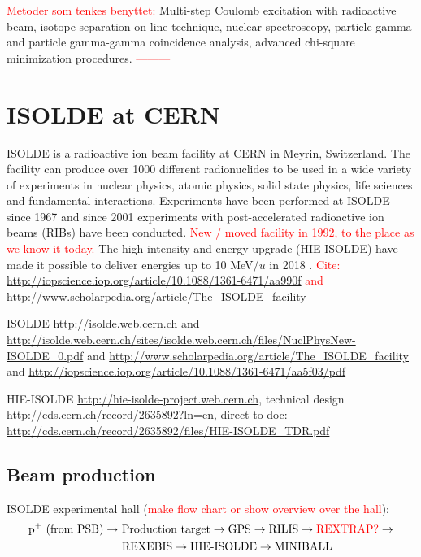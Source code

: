 \documentclass[twoside,english]{uiofysmaster/uiofysmaster}
\begin{document}
\textcolor{red}{Metoder som tenkes benyttet:} \newline
Multi-step Coulomb excitation with radioactive beam, isotope separation on-line technique, nuclear spectroscopy, particle-gamma and particle gamma-gamma coincidence analysis, advanced chi-square minimization procedures. \newline
\textcolor{red}{---------} \newline


\section{ISOLDE at CERN}
ISOLDE is a radioactive ion beam facility at CERN in Meyrin, Switzerland. The facility can produce over 1000 different radionuclides to be used in a wide variety of experiments in nuclear physics, atomic physics, solid state physics, life sciences and fundamental interactions. Experiments have been performed at ISOLDE since 1967 and since 2001 experiments with post-accelerated radioactive ion beams (RIBs) have been conducted. \textcolor{red}{New / moved facility in 1992, to the place as we know it today.} The high intensity and energy upgrade (HIE-ISOLDE) have made it possible to deliver energies up to 10 MeV/$u$ in 2018 \cite{Borge2018}. 
 \textcolor{red}{Cite: \url{http://iopscience.iop.org/article/10.1088/1361-6471/aa990f} and \url{http://www.scholarpedia.org/article/The_ISOLDE_facility}}  


\bigskip

ISOLDE \url{http://isolde.web.cern.ch} and \url{http://isolde.web.cern.ch/sites/isolde.web.cern.ch/files/NuclPhysNew-ISOLDE_0.pdf} and \url{http://www.scholarpedia.org/article/The_ISOLDE_facility}  and \url{http://iopscience.iop.org/article/10.1088/1361-6471/aa5f03/pdf}


HIE-ISOLDE \url{http://hie-isolde-project.web.cern.ch}, technical design \url{http://cds.cern.ch/record/2635892?ln=en}, direct to doc: \url{http://cds.cern.ch/record/2635892/files/HIE-ISOLDE_TDR.pdf}


\subsection{Beam production}

ISOLDE experimental hall (\textcolor{red}{make flow chart or show overview over the hall}):
\begin{align*}
	\text{p}^+ ~(\text{from PSB}) \rightarrow~ &\text{Production target} \rightarrow \text{GPS} \rightarrow \text{RILIS} \rightarrow \text{\textcolor{red}{REXTRAP?}} \rightarrow \\
 &\text{REXEBIS} \rightarrow \text{HIE-ISOLDE} \rightarrow \text{MINIBALL}
\end{align*}
\end{document}
